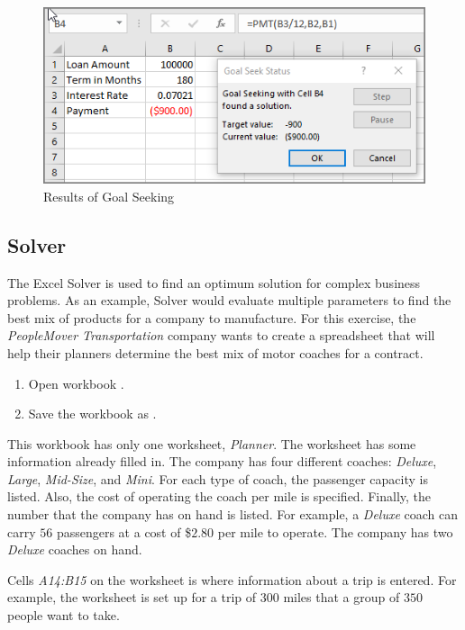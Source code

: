 \begin{figure}[H]
	\centering
	\includegraphics[width=\maxwidth{.95\linewidth}]{gfx/ch08_fig61}
	\caption{Results of Goal Seeking}
	\label{08:fig61}
\end{figure}

\subsection{Solver}

The Excel Solver is used to find an optimum solution for complex business problems. As an example, Solver would evaluate multiple parameters to find the best mix of products for a company to manufacture. For this exercise, the \textit{PeopleMover Transportation} company wants to create a spreadsheet that will help their planners determine the best mix of motor coaches for a contract.

\begin{enumerate}
	\item Open workbook .
	\item Save the workbook as .
\end{enumerate}

This workbook has only one worksheet, \textit{Planner}. The worksheet has some information already filled in. The company has four different coaches: \textit{Deluxe}, \textit{Large}, \textit{Mid-Size}, and \textit{Mini}. For each type of coach, the passenger capacity is listed. Also, the cost of operating the coach per mile is specified. Finally, the number that the company has on hand is listed. For example, a \textit{Deluxe} coach can carry $ 56 $ passengers at a cost of \$$ 2.80 $ per mile to operate. The company has two \textit{Deluxe} coaches on hand.

Cells \textit{A14:B15} on the worksheet is where information about a trip is entered. For example, the worksheet is set up for a trip of $ 300 $ miles that a group of $ 350 $ people want to take.

